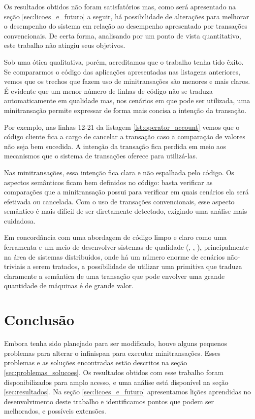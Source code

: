 \documentclass[11pt,twoside,a4paper]{book}
\begin{document}
Os resultados obtidos não foram satisfatórios mas, como será apresentado na seção \ref{sec:licoes_e_futuro} a seguir, há possibilidade de alterações para melhorar o desempenho do sistema em relação ao desempenho apresentado por transações convencionais. De certa forma, analisando por um ponto de vista quantitativo, este trabalho não atingiu seus objetivos.

Sob uma ótica qualitativa, porém, acreditamos que o trabalho tenha tido êxito. Se compararmos o código das aplicações apresentadas nas listagens anteriores, vemos que os trechos que fazem uso de minitransações são menores e mais claros. É evidente que um menor número de linhas de código não se traduza automaticamente em qualidade mas, nos cenários em que pode ser utilizada, uma minitransação permite expressar de forma mais concisa a intenção da transação.

Por exemplo, nas linhas 12-21 da listagem \ref{lst:operator_account} vemos que o código cliente fica a cargo de cancelar a transação caso a comparação de valores não seja bem sucedida. A intenção da transação fica perdida em meio aos mecanismos que o sistema de transações oferece para utilizá-las. 

Nas minitransações, essa intenção fica clara e não espalhada pelo código. Os aspectos semânticos ficam bem definidos no código: basta verificar as comparações que a minitransação possui para verificar em quais cenários ela será efetivada ou cancelada. Com o uso de transações convencionais, esse aspecto semântico é mais difícil de ser diretamente detectado, exigindo uma análise mais cuidadosa.

Em concordância com uma abordagem de código limpo e claro como uma ferramenta e um meio de desenvolver sistemas de qualidade (\cite{clean_code}, \cite{xp}, \cite{refactoring}), principalmente na área de sistemas distribuídos, onde há um número enorme de cenários não-triviais a serem tratados, a possibilidade de utilizar uma primitiva que traduza claramente a semântica de uma transação que pode envolver uma grande quantidade de máquinas é de grande valor.

\chapter{Conclusão}
\label{cap:conclusao}

Embora tenha sido planejado para ser modificado, houve alguns pequenos problemas para alterar o infinispan para executar minitransações. Esses problemas e as soluções encontradas estão descritos na seção \ref{sec:problemas_solucoes}. Os resultados obtidos com esse trabalho foram disponibilizados para amplo acesso, e uma análise está disponível na seção \ref{sec:resultados}. Na seção \ref{sec:licoes_e_futuro} apresentamos lições aprendidas no desenvolvimento deste trabalho e identificamos pontos que podem ser melhorados, e possíveis extensões.
\end{document}
